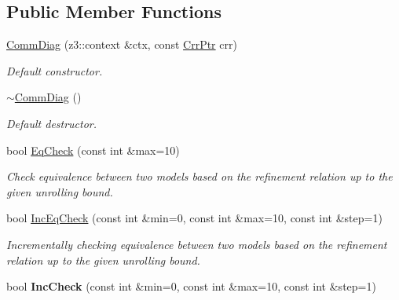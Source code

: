 \subsection*{Public Member Functions}
\begin{DoxyCompactItemize}
\item 
\mbox{\label{classilang_1_1_comm_diag_ae4a2740c66b7832bb22aec6744f3df2f}} 
\mbox{\hyperlink{classilang_1_1_comm_diag_ae4a2740c66b7832bb22aec6744f3df2f}{Comm\+Diag}} (z3\+::context \&ctx, const \mbox{\hyperlink{namespaceilang_a3c2c096b87ad7a9475c5a32315c18ba6}{Crr\+Ptr}} crr)
\begin{DoxyCompactList}\small\item\em Default constructor. \end{DoxyCompactList}\item 
\mbox{\label{classilang_1_1_comm_diag_aad71b5b375e8b9f848ccc7ac0afdad5d}} 
\mbox{\hyperlink{classilang_1_1_comm_diag_aad71b5b375e8b9f848ccc7ac0afdad5d}{$\sim$\+Comm\+Diag}} ()
\begin{DoxyCompactList}\small\item\em Default destructor. \end{DoxyCompactList}\item 
bool \mbox{\hyperlink{classilang_1_1_comm_diag_ab5f4df82ccead4a6b23df4096df344d0}{Eq\+Check}} (const int \&max=10)
\begin{DoxyCompactList}\small\item\em Check equivalence between two models based on the refinement relation up to the given unrolling bound. \end{DoxyCompactList}\item 
bool \mbox{\hyperlink{classilang_1_1_comm_diag_afe69e51f7e659fbeb5fa0a247bf8ee49}{Inc\+Eq\+Check}} (const int \&min=0, const int \&max=10, const int \&step=1)
\begin{DoxyCompactList}\small\item\em Incrementally checking equivalence between two models based on the refinement relation up to the given unrolling bound. \end{DoxyCompactList}\item 
\mbox{\label{classilang_1_1_comm_diag_a9665e2a03ce96d33bfea64e1caa92eae}} 
bool {\bfseries Inc\+Check} (const int \&min=0, const int \&max=10, const int \&step=1)
\end{DoxyCompactItemize}


